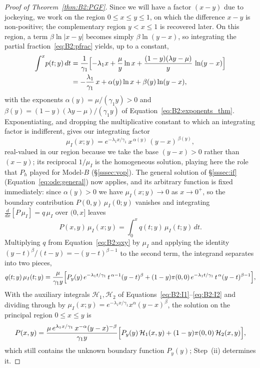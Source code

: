\begin{proof}[Proof of Theorem~\ref{thm:B2:PGF}]
Since we will have a factor $(x-y)$ due to jockeying, we work on the region $0\leq x\leq y\leq1$, on which the difference $x-y$ is non-positive; the complementary region $y<x\le1$ is recovered later. On this region, a term $\beta\ln|x-y|$ becomes simply $\beta\ln(y-x)$, so integrating the partial fraction~\eqref{eq:B2:pfrac} yields, up to a constant,
\begin{align*}
    \int^{x}\! p(t;y)\,dt
    &= \frac{1}{\gamma_1}\Bigl[-\lambda_1 x + \frac{\mu}{y}\ln x
       + \frac{(1-y)(\lambda y-\mu)}{y}\,\ln(y-x)\Bigr] \\
    &= -\frac{\lambda_1}{\gamma_1}\,x + \alpha(y)\ln x + \beta(y)\ln(y-x),
\end{align*}
with the exponents $\alpha(y)=\mu/(\gamma_1 y)>0$ and $\beta(y)=(1-y)(\lambda y-\mu)/(\gamma_1 y)$ of Equation~\eqref{eq:B2:exponents_thm}. Exponentiating, and dropping the multiplicative constant to which an integrating factor is indifferent, gives our integrating factor
\begin{equation*}
    \mu_I(x;y) = e^{-\lambda_1 x/\gamma_1}\,x^{\,\alpha(y)}\,(y-x)^{\,\beta(y)},
\end{equation*}
real-valued in our region because we take the base $(y-x)>0$ rather than $(x-y)$; its reciprocal $1/\mu_I$ is the homogeneous solution, playing here the role that $P_h$ played for Model-$B$ (\S\ref{sssec:vop}).
The general solution of \S\ref{sssec:if} (Equation~\eqref{eq:ode:general}) now applies, and its arbitrary function is fixed immediately: since $\alpha(y)>0$ we have $\mu_I(x;y)\to0$ as $x\to0^{+}$, so the boundary contribution $P(0,y)\,\mu_I(0;y)$ vanishes and integrating $\tfrac{d}{dx}[P\,\mu_I]=q\,\mu_I$ over $(0,x]$ leaves
\begin{equation*}
    P(x,y)\,\mu_I(x;y) = \int_0^x q(t;y)\,\mu_I(t;y)\,dt.
\end{equation*}
Multiplying $q$ from Equation~\eqref{eq:B2:qxy} by $\mu_I$ and applying the identity
$(y-t)^{\beta}/(t-y)=-(y-t)^{\beta-1}$ to the second term, the integrand separates into two pieces,
\begin{equation*}
    q(t;y)\,\mu_I(t;y) = \frac{\mu}{\gamma_1 y}\Bigl[
        P_y(y)\,e^{-\lambda_1 t/\gamma_1}\,t^{\,\alpha-1}(y-t)^{\beta}
        + (1-y)\pi(0,0)\,e^{-\lambda_1 t/\gamma_1}\,t^{\,\alpha}(y-t)^{\beta-1}
    \Bigr],
\end{equation*}
With the auxiliary integrals $\mathcal{H}_1,\mathcal{H}_2$ of Equations~\eqref{eq:B2:I1}--\eqref{eq:B2:I2} and dividing through by $\mu_I(x;y)=e^{-\lambda_1 x/\gamma_1}x^{\alpha}(y-x)^{\beta}$, the solution on the principal region $0\le x\le y$ is
\begin{equation}
    P(x,y) = \frac{\mu\,e^{\lambda_1 x/\gamma_1}\,x^{-\alpha}(y-x)^{-\beta}}{\gamma_1 y}
    \Bigl[P_y(y)\,\mathcal{H}_1(x,y) + (1-y)\pi(0,0)\,\mathcal{H}_2(x,y)\Bigr],
    \label{eq:B2:Pxy_real}
\end{equation}
which still contains the unknown boundary function $P_y(y)$; Step~(ii) determines it.


\end{proof}
